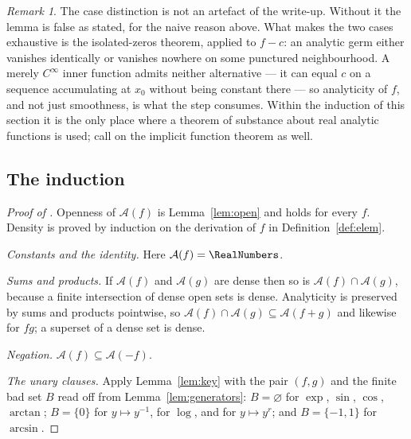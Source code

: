 \documentclass[11pt,oneside]{article}
\theoremstyle{definition}
\theoremstyle{remark}
\newtheorem{remark}[theorem]{Remark}
\newcommand{\An}{\mathcal A}
\begin{document}
\begin{remark}
The case distinction is not an artefact of the write-up.  Without it the lemma
is false as stated, for the naive reason above.  What makes the two cases
exhaustive is the isolated-zeros theorem, applied to $f-c$: an analytic germ
either vanishes identically or vanishes nowhere on some punctured
neighbourhood.  A merely $C^\infty$ inner function admits neither
alternative --- it can equal $c$ on a sequence accumulating at $x_0$ without
being constant there --- so analyticity of $f$, and not just smoothness, is
what the step consumes.  Within the induction of this section it is the only
place where a theorem of substance about real analytic functions is used;
 call on the implicit function theorem as
well.
\end{remark}

\subsection{The induction}

\begin{proof}[Proof of ]
Openness of $\An(f)$ is Lemma~\ref{lem:open} and holds for every $f$.  Density is
proved by induction on the derivation of $f$ in Definition~\ref{def:elem}.

\emph{Constants and the identity.}  Here $\An(f)=\RealNumbers$.

\emph{Sums and products.}  If $\An(f)$ and $\An(g)$ are dense then so is
$\An(f)\cap\An(g)$, because a finite intersection of dense open sets is dense.
Analyticity is preserved by sums and products pointwise, so
$\An(f)\cap\An(g)\subseteq\An(f+g)$ and likewise for $fg$; a superset of a
dense set is dense.

\emph{Negation.}  $\An(f)\subseteq\An(-f)$.

\emph{The unary clauses.}  Apply Lemma~\ref{lem:key} with the pair $(f,g)$ and the
finite bad set $B$ read off from Lemma~\ref{lem:generators}: $B=\varnothing$ for
$\exp$, $\sin$, $\cos$, $\arctan$; $B=\{0\}$ for $y\mapsto y^{-1}$, for
$\log$, and for $y\mapsto y^{r}$; and $B=\{-1,1\}$ for $\arcsin$.
\end{proof}
\end{document}
